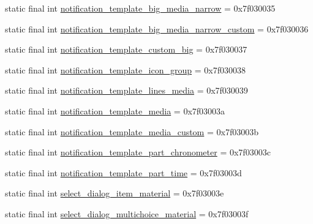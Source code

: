 \begin{CompactItemize}
static final int \hyperlink{classandroid_1_1support_1_1graphics_1_1drawable_1_1animated_1_1_r_1_1layout_f0ce0d50611cebba51559c64b68f4277}{notification\_\-template\_\-big\_\-media\_\-narrow} = 0x7f030035
\item 
static final int \hyperlink{classandroid_1_1support_1_1graphics_1_1drawable_1_1animated_1_1_r_1_1layout_5a76b71bb5881e30330174b47da129ae}{notification\_\-template\_\-big\_\-media\_\-narrow\_\-custom} = 0x7f030036
\item 
static final int \hyperlink{classandroid_1_1support_1_1graphics_1_1drawable_1_1animated_1_1_r_1_1layout_8d3fdf09b0904d4a54a5aa640d7794ef}{notification\_\-template\_\-custom\_\-big} = 0x7f030037
\item 
static final int \hyperlink{classandroid_1_1support_1_1graphics_1_1drawable_1_1animated_1_1_r_1_1layout_87a0f85b0fde7c476201c9dd6365f87c}{notification\_\-template\_\-icon\_\-group} = 0x7f030038
\item 
static final int \hyperlink{classandroid_1_1support_1_1graphics_1_1drawable_1_1animated_1_1_r_1_1layout_bd1503c60ee8d90f4ca3ea7a17e83212}{notification\_\-template\_\-lines\_\-media} = 0x7f030039
\item 
static final int \hyperlink{classandroid_1_1support_1_1graphics_1_1drawable_1_1animated_1_1_r_1_1layout_140f45434a8470f74b9aed56d7c464fd}{notification\_\-template\_\-media} = 0x7f03003a
\item 
static final int \hyperlink{classandroid_1_1support_1_1graphics_1_1drawable_1_1animated_1_1_r_1_1layout_807345665ab729a4a55d08e0dc52a052}{notification\_\-template\_\-media\_\-custom} = 0x7f03003b
\item 
static final int \hyperlink{classandroid_1_1support_1_1graphics_1_1drawable_1_1animated_1_1_r_1_1layout_82fa07dc2a3a3c77df5b87705559d428}{notification\_\-template\_\-part\_\-chronometer} = 0x7f03003c
\item 
static final int \hyperlink{classandroid_1_1support_1_1graphics_1_1drawable_1_1animated_1_1_r_1_1layout_ca653868a4230e569fb13e5dacff41b3}{notification\_\-template\_\-part\_\-time} = 0x7f03003d
\item 
static final int \hyperlink{classandroid_1_1support_1_1graphics_1_1drawable_1_1animated_1_1_r_1_1layout_dfbb7f495768fa3c22334042f06e9471}{select\_\-dialog\_\-item\_\-material} = 0x7f03003e
\item 
static final int \hyperlink{classandroid_1_1support_1_1graphics_1_1drawable_1_1animated_1_1_r_1_1layout_20a16d396bea3cf456c1494af69f1698}{select\_\-dialog\_\-multichoice\_\-material} = 0x7f03003f

\end{CompactItemize}

